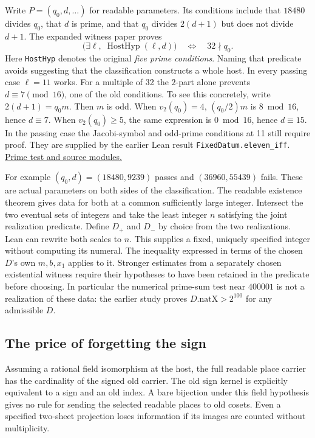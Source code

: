 \documentclass[12pt,letterpaper]{article}
\newcommand{\id}[1]{{\small\nolinkurl{#1}}}
\newcommand{\oldpaper}[2]{\href{https://github.com/nousentllc/riemann-hypothesis/tree/90e46dd4be3b077bfed33fa64280eb9f306c9d87/research/uriel/experiments/#1}{#2}}
\begin{document}
Write $P=(q_0,d,\ldots)$ for readable parameters. Its conditions include that $18480$ divides $q_0$, that $d$ is prime, and that $q_0$ divides $2(d+1)$ but does not divide $d+1$. The expanded witness paper proves
\[
  \big(\exists \ell,\;\operatorname{HostHyp}(\ell,d)\big)
  \quad\Longleftrightarrow\quad 32\nmid q_0 .
\]
Here \id{HostHyp} denotes the original \emph{five prime conditions}. Naming that predicate avoids suggesting that the classification constructs a whole host. In every passing case $\ell=11$ works. For a multiple of 32 the $2$-part alone prevents $d\equiv7\pmod{16}$, one of the old conditions. To see this concretely, write $2(d+1)=q_0 m$. Then $m$ is odd. When $v_2(q_0)=4$, $(q_0/2)m$ is $8\bmod16$, hence $d\equiv7$. When $v_2(q_0)\ge5$, the same expression is $0\bmod16$, hence $d\equiv15$. In the passing case the Jacobi-symbol and odd-prime conditions at 11 still require proof. They are supplied by the earlier Lean result \id{FixedDatum.eleven_iff}. \oldpaper{fixed-datum-host-expanded}{Prime test and source modules.}

For example $(q_0,d)=(18480,9239)$ passes and $(36960,55439)$ fails. These are actual parameters on both sides of the classification. The readable existence theorem gives data for both at a common sufficiently large integer. Intersect the two eventual sets of integers and take the least integer $n$ satisfying the joint realization predicate. Define $D_+$ and $D_-$ by choice from the two realizations. Lean can rewrite both scales to $n$. This supplies a fixed, uniquely specified integer without computing its numeral. The inequality expressed in terms of the chosen $D$'s own $m,b,x_1$ applies to it. Stronger estimates from a separately chosen existential witness require their hypotheses to have been retained in the predicate before choosing. In particular the numerical prime-sum test near $400001$ is not a realization of these data: the earlier study proves $D.\mathrm{natX}>2^{100}$ for any admissible $D$.

\subsection{The price of forgetting the sign}
Assuming a rational field isomorphism at the host, the full readable place carrier has the cardinality of the signed old carrier. The old sign kernel is explicitly equivalent to a sign and an old index. A bare bijection under this field hypothesis gives no rule for sending the selected readable places to old cosets. Even a specified two-sheet projection loses information if its images are counted without multiplicity.
\end{document}
